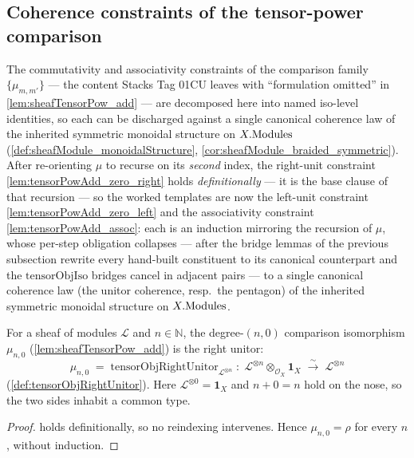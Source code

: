 \subsection{Coherence constraints of the tensor-power comparison}
\label{subsec:sgr_tensorPowAdd_constraints}

The commutativity and associativity constraints of the comparison family
\(\{\mu_{m,m'}\}\) --- the content Stacks Tag 01CU leaves with ``formulation
omitted'' in \cref{lem:sheafTensorPow_add} --- are decomposed here into named
iso-level identities, so each can be discharged against a single canonical
coherence law of the inherited symmetric monoidal structure on \(X.\mathrm{Modules}\)
(\cref{def:sheafModule_monoidalStructure},
\cref{cor:sheafModule_braided_symmetric}). After re-orienting \(\mu\) to recurse on
its \emph{second} index, the right-unit constraint
\cref{lem:tensorPowAdd_zero_right} holds \emph{definitionally} --- it is the base
clause of that recursion --- so the worked templates are now the left-unit
constraint \cref{lem:tensorPowAdd_zero_left} and the associativity constraint
\cref{lem:tensorPowAdd_assoc}: each is an induction mirroring the recursion of
\(\mu\), whose per-step obligation collapses --- after the bridge lemmas of the
previous subsection rewrite every hand-built constituent to its canonical
counterpart and the \(\mathrm{tensorObjIso}\) bridges cancel in adjacent pairs ---
to a single canonical coherence law (the unitor coherence, resp.\ the pentagon) of
the inherited symmetric monoidal structure on \(X.\mathrm{Modules}\).

\begin{lemma}\leanok
  \label{lem:tensorPowAdd_zero_right}
  For a sheaf of modules \(\mathcal{L}\) and \(n \in \mathbb{N}\), the degree-\((n,0)\)
  comparison isomorphism \(\mu_{n,0}\) (\cref{lem:sheafTensorPow_add}) is the right
  unitor:
  \[
    \mu_{n,0} \;=\;
      \mathrm{tensorObjRightUnitor}_{\mathcal{L}^{\otimes n}}
    \;:\; \mathcal{L}^{\otimes n} \otimes_{\mathcal{O}_X} \mathbf{1}_X
    \;\xrightarrow{\ \sim\ }\; \mathcal{L}^{\otimes n}
  \]
  (\cref{def:tensorObjRightUnitor}). Here \(\mathcal{L}^{\otimes 0} = \mathbf{1}_X\)
  and \(n + 0 = n\) hold on the nose, so the two sides inhabit a common type.
\end{lemma}

\begin{proof}
  \leanok
  holds definitionally, so no reindexing intervenes. Hence \(\mu_{n,0} = \rho\) for
  every \(n\), without induction.
\end{proof}

